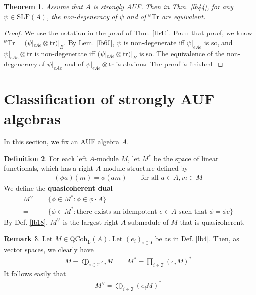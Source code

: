 \documentclass[11pt,b5paper,notitlepage]{article}
\theoremstyle{definition}
\newtheorem{df}{Definition}[section]
\newtheorem{rem}[df]{Remark}
\theoremstyle{plain}
\newtheorem{thm}[df]{Theorem}
\newcommand{\fk}{\mathfrak}
\newcommand{\Tr}{\mathrm{Tr}}
\newcommand{\QC}{\mathrm{QCoh}_{\mathrm L}}
\newcommand{\SLF}{\mathrm{SLF}}
\newcommand{\trc}{\mathrm{tr}}
\numberwithin{equation}{section}
\begin{document}
\begin{thm}\label{lb64}
Assume that $A$ is strongly AUF. Then in Thm. \ref{lb44}, for any $\psi\in\SLF(A)$, the non-degeneracy of $\psi$ and of ${^\psi}\Tr$ are equivalent.
\end{thm}

\begin{proof}
We use the notation in the proof of Thm. \ref{lb44}. From that proof, we know ${^\psi}\Tr=(\psi|_{eAe}\otimes\trc)|_B$. By Lem. \ref{lb60}, $\psi$ is non-degenerate iff $\psi|_{eAe}$ is so, and $\psi|_{eAe}\otimes\trc$ is non-degenerate iff $(\psi|_{eAe}\otimes\trc)|_B$ is so. The equivalence of the non-degeneracy of $\psi|_{eAe}$ and of $\psi|_{eAe}\otimes\trc$ is obvious. The proof is finished. 
\end{proof}





\section{Classification of strongly AUF algebras}\label{lb63}



In this section, we fix an AUF algebra $A$. 

\begin{df}
For each left $A$-module $M$, let $M^*$ be the space of linear functionals, which has a right $A$-module structure defined by
\begin{align*}
(\phi a)(m)=\phi(am)\qquad \text{for all }a\in A,m\in M
\end{align*}
We define the \textbf{quasicoherent dual}
\begin{align*}
M^\vee=&\{\phi\in M^*:\phi\in\phi\cdot A\}\\
=&\{\phi\in M^*:\text{there exists an idempotent $e\in A$ such that $\phi=\phi e$}\}
\end{align*}
By Def. \ref{lb18}, $M^\vee$ is the largest right $A$-submodule of $M$ that is quasicoherent.
\end{df}


\begin{rem}\label{lb57}
Let $M\in\QC(A)$. Let $(e_i)_{i\in\fk I}$ be as in Def. \ref{lb4}. Then, as vector spaces, we clearly have
\begin{align*}
M=\bigoplus_{i\in\fk I}e_iM\qquad M^*=\prod_{i\in\fk I}(e_iM)^*
\end{align*}
It follows easily that
\begin{align*}
M^\vee=\bigoplus_{i\in\fk I}(e_iM)^*
\end{align*}
\end{rem}
\end{document}
